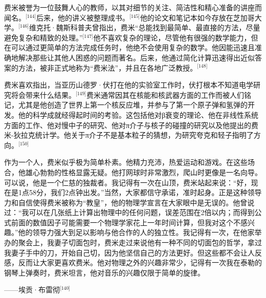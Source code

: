 费米被誉为一位鼓舞人心的教师，以其对细节的关注、简洁性和精心准备的讲座而闻名。\(^\text{[144]}\)后来，他的讲义被整理成书。\(^\text{[145]}\)他的论文和笔记本如今存放在芝加哥大学。\(^\text{[146]}\)维克托·魏斯科普夫曾指出，费米“总能找到最简单、最直接的方法，尽量避免复杂和精致的处理。”\(^\text{[147]}\)他不喜欢复杂的理论，尽管他有很强的数学能力，但在可以通过更简单的方法完成任务时，他绝不会使用复杂的数学。他因能迅速且准确地解决那些让其他人困惑的问题而著名。后来，他通过简化计算迅速得出近似答案的方法，被非正式地称为“费米法”，并且在各地广泛教授。\(^\text{[148]}\)

费米喜欢指出，当亚历山德罗·伏打在他的实验室工作时，伏打根本不知道电学研究将会带来什么结果。\(^\text{[149]}\)费米通常因其在核能和核武器方面的工作而被人们铭记，尤其是他创造了世界上第一个核反应堆，并参与了第一个原子弹和氢弹的开发。他的科学成就经得起时间的考验。这包括他对β衰变的理论、他在非线性系统方面的工作、他对慢中子的研究、他对π介子与核子的碰撞的研究以及他提出的费米-狄拉克统计学。他关于π介子不是基本粒子的猜想，为研究夸克和轻子指明了方向。\(^\text{[150]}\)

作为一个人，费米似乎极为简单朴素。他精力充沛，热爱运动和游戏。在这些场合，他雄心勃勃的性格显露无疑。他打网球时非常激烈，爬山时更像是一名向导。可以说，他是一个仁慈的独裁者。我记得有一次在山顶，费米站起来说：“好，现在是1点58分，我们2点钟出发。”当然，大家都信守承诺，准时起身。正是这种领导力和自信使得费米被称为“教皇”，他的物理学宣言在大家眼中是无误的。他曾说过：“我可以在几张纸上计算出物理中的任何问题，误差范围在2倍以内；而得到公式前面的数值因子可能需要一个物理学家花上一年时间计算，但我对这个不感兴趣。”他的领导力强大到足以影响与他合作的人的独立性。我记得有一次，在他家举办的聚会上，我妻子切面包时，费米走过来说他有一种不同的切面包的哲学，拿过我妻子手中的刀，开始自己切，因为他坚信自己的方法更好。但这些都不会让人反感，反而让大家更喜欢费米。他对物理之外的兴趣非常少，记得有一次我在泰勒的钢琴上弹奏时，费米坦言，他对音乐的兴趣仅限于简单的旋律。

——埃贡·布雷彻\(^\text{[140]}\)

